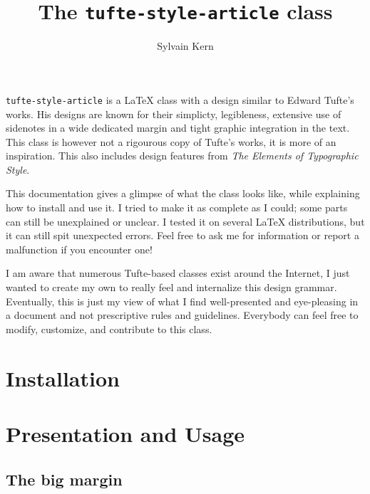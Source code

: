 \documentclass[raggedright, 11pt]{tufte-style-article}
\title{The \texttt{tufte-style-article} class}
\author{Sylvain Kern}
\begin{document}
	
\maketitle	

\noindent
\texttt{tufte-style-article} is a \LaTeX{} class with a design similar to Edward Tufte's works. His designs are known for their simplicty, legibleness, extensive use of sidenotes in a wide dedicated margin and tight graphic integration in the text. This class is however not a rigourous copy of Tufte's works, it is more of an inspiration. This also includes design features from \textit{The Elements of Typographic Style}.

This documentation gives a glimpse of what the class looks like, while explaining how to install and use it. I tried to make it as complete as I could; some parts can still be unexplained or unclear. I tested it on several \LaTeX{} distributions, but it can still spit unexpected errors. Feel free to ask me for information or report a malfunction if you encounter one!

I am aware that numerous Tufte-based classes exist around the Internet, I just wanted to create my own to really feel and internalize this design grammar. Eventually, this is just my view of what I find well-presented and eye-pleasing in a document and not prescriptive rules and guidelines. Everybody can feel free to modify, customize, and contribute to this class.



\tableofcontents

\newpage

\section{Installation}

\section{Presentation and Usage}

\subsection{The big margin}
\end{document}
